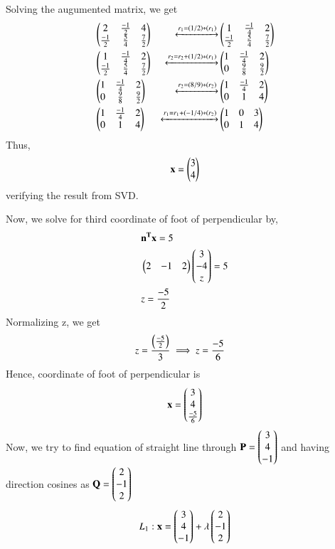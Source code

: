 \documentclass[journal,12pt,twocolumn]{IEEEtran}
\begin{document}
Solving the augumented matrix, we get
\begin{align}
& \begin{pmatrix}2 & \frac{-1}{2} & 4 \\ \frac{-1}{2} & \frac{5}{4} & \frac{7}{2}\end{pmatrix} 
&\xleftrightarrow[]{r_1 = (1/2)*(r_1) } & \begin{pmatrix}1 & \frac{-1}{4} & 2 \\ \frac{-1}{2} & \frac{5}{4} & \frac{7}{2}\end{pmatrix} \\
& \begin{pmatrix}1 & \frac{-1}{4} & 2 \\ \frac{-1}{2} & \frac{5}{4} & \frac{7}{2}\end{pmatrix} & \xleftrightarrow[]{r_2 = r_2 + (1/2)*(r_1)} & \begin{pmatrix}1 & \frac{-1}{4} & 2 \\ 0 & \frac{9}{8} & \frac{9}{2}\end{pmatrix} \\
&\begin{pmatrix}1 & \frac{-1}{4} & 2 \\ 0 & \frac{9}{8} & \frac{9}{2}\end{pmatrix} &\xleftrightarrow[]{r_2 =(8/9)*(r_2)} & \begin{pmatrix}1 & \frac{-1}{4} & 2 \\ 0 & 1 & 4\end{pmatrix} \\
& \begin{pmatrix}1 & \frac{-1}{4} & 2 \\ 0 & 1 & 4\end{pmatrix} &\xleftrightarrow[]{r_1 = r_1 + (-1/4)*(r_2)} & \begin{pmatrix}1 & 0 & 3 \\ 0 & 1 & 4\end{pmatrix}
\end{align}
Thus,
\begin{align}
	\mathbf{x} = \begin{pmatrix}3\\4\end{pmatrix} 
\end{align}
verifying the result from SVD.

Now, we solve for third coordinate of foot of perpendicular by,
\begin{align}
&\mathbf{n^Tx} = 5 \\
& \begin{pmatrix}2 & -1 & 2\end{pmatrix}\begin{pmatrix}3 \\ -4 \\ z\end{pmatrix} = 5\\
& z = \frac{-5}{2}
\end{align}
Normalizing z, we get
\begin{align}
	& z = \frac{\left(\frac{-5}{2}\right)}{3} \implies z = \frac{-5}{6}
\end{align}
Hence, coordinate of foot of perpendicular is
\begin{align}
	\mathbf{x} = \begin{pmatrix}3 \\ 4\\\frac{-5}{6}\end{pmatrix}
\end{align}
Now, we try to find equation of straight line through $\mathbf{P}= \begin{pmatrix}3\\4\\-1\end{pmatrix}$ and having direction cosines as $\mathbf{Q}= \begin{pmatrix}2 \\-1 \\ 2\end{pmatrix}$
\begin{align}
	L_1 :  \mathbf{x} = \begin{pmatrix}3\\4\\-1\end{pmatrix} + \lambda\begin{pmatrix}2 \\-1\\2\end{pmatrix}
\end{align}
\end{document}
